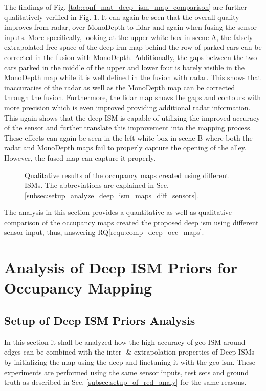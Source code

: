 The findings of Fig. \ref{tab:conf_mat_deep_ism_map_comparison} are further qualitatively verified in Fig. \ref{fig:comparison_of_maps_diff_sens}. It can again be seen that the overall quality improves from radar, over MonoDepth to lidar and again when fusing the sensor inputs. More specifically, looking at the upper white box in scene A, the falsely extrapolated free space of the deep \gls{irm} map behind the row of parked cars can be corrected in the fusion with MonoDepth. Additionally, the gaps between the two cars parked in the middle of the upper and lower four is barely visible in the MonoDepth map while it is well defined in the fusion with radar. This shows that inaccuracies of the radar as well as the MonoDepth map can be corrected through the fusion. Furthermore, the lidar map shows the gaps and contours with more precision which is even improved providing additional radar information. This again shows that the deep ISM is capable of utilizing the improved accuracy of the sensor and further translate this improvement into the mapping process. These effects can again be seen in the left white box in scene B where both the radar and MonoDepth maps fail to properly capture the opening of the alley. However, the fused map can capture it properly.
\begin{figure}[H]
	\begin{center}
		\caption{\label{fig:comparison_of_maps_diff_sens}Qualitative results of the occupancy maps created using different ISMs. The abbreviations are explained in Sec. \ref{subsec:setup_analyze_deep_ism_maps_diff_sensors}.}
	\end{center}
\end{figure}
The analysis in this section provides a quantitative as well as qualitative comparison of the occupancy maps created the proposed deep \gls{ism} using different sensor input, thus, answering RQ\ref{requ:comp_deep_occ_maps}.
%
\section{Analysis of Deep ISM Priors for Occupancy Mapping}
\label{sec:exp_analyze_prior_properties}
%
\subsection{Setup of Deep ISM Priors Analysis}
\label{subsec:setup_of_prior_analy}
In this section it shall be analyzed how the high accuracy of geo ISM around edges can be combined with the inter- \& extrapolation properties of Deep ISMs by initializing the map using the deep and finetuning it with the geo \gls{ism}. These experiments are performed using the same sensor inputs, test sets and ground truth as described in Sec. \ref{subsec:setup_of_red_analy} for the same reasons. 

